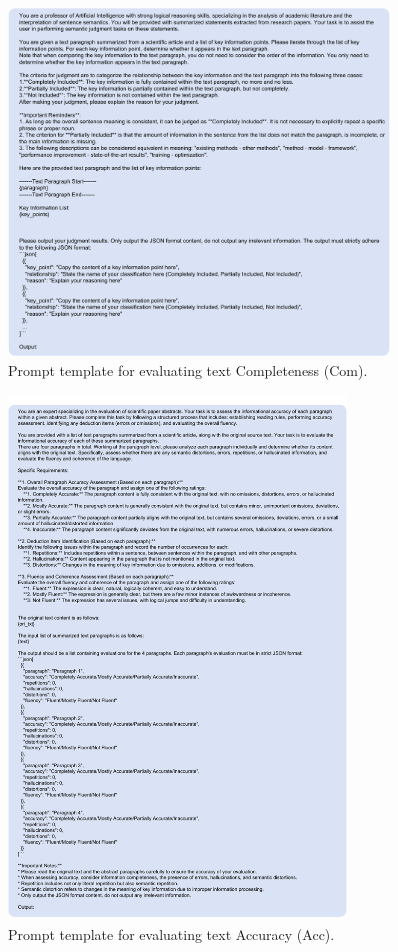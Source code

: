 \begin{figure}[t]
\centering
\includegraphics[width=0.9\textwidth]{figs/prompt_com}
\caption{Prompt template for evaluating text Completeness (Com).}
\label{fig:prompt_com}
\end{figure}

\begin{figure}[t]
\centering
\includegraphics[width=0.8\textwidth]{figs/prompt_acc}
\caption{Prompt template for evaluating text Accuracy (Acc).}
\label{fig:prompt_acc}
\end{figure}

